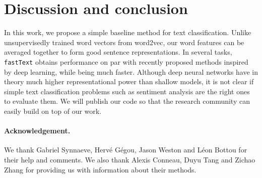 \section{Discussion and conclusion}

In this work, we propose a simple baseline method for text
classification. Unlike unsupervisedly trained word vectors from word2vec, our
word features can be averaged together to form good sentence representations.
In several tasks, \texttt{fastText} obtains performance on par with recently
proposed methods inspired by deep learning, while being much faster.  Although
deep neural networks have in theory much higher representational power than
shallow models, it is not clear if simple text classification problems such as
sentiment analysis are the right ones to evaluate them.  We will publish our
code so that the research community can easily build on top of our work.

\paragraph{Acknowledgement.} We thank Gabriel Synnaeve, Herv\'e G\'egou,
Jason Weston and L\'eon Bottou for their help and comments. We also thank
Alexis Conneau, Duyu Tang and Zichao Zhang for providing us with
information about their methods.
